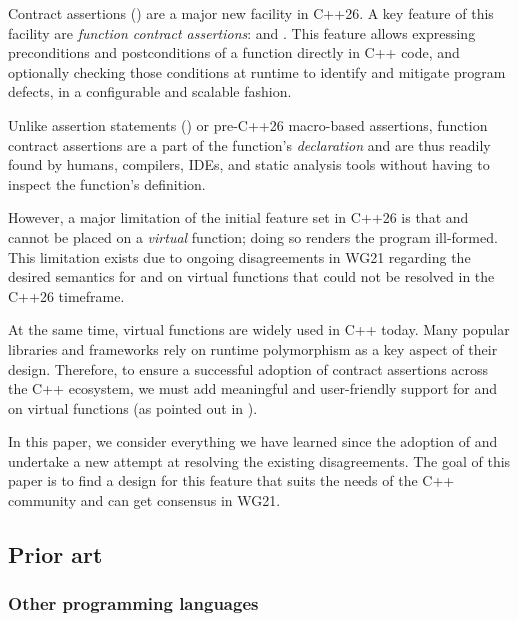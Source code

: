 Contract assertions (\cite{P2900R14}) are a major new facility in C++26. A key feature of this facility are \emph{function contract assertions}:  and . This feature allows expressing
preconditions and postconditions of a function directly in C++ code, and optionally checking those conditions at runtime to identify and mitigate program defects, in a configurable and scalable fashion. 

Unlike assertion statements () or pre-C++26 macro-based assertions, function contract assertions are a part of the function's \emph{declaration} and are thus readily found by humans, compilers, IDEs, and static analysis tools without having to inspect the function's definition. 

However, a major limitation of the initial feature set in C++26 is that  and  cannot be placed on a \emph{virtual} function; doing so renders the program ill-formed. This limitation exists due to ongoing disagreements in WG21 regarding the desired semantics for  and  on virtual functions that could not be resolved in the C++26 timeframe.

At the same time, virtual functions are widely used in C++ today. Many popular libraries and frameworks rely on runtime polymorphism as a key aspect of their design. Therefore, to ensure a successful adoption of contract assertions across the C++ ecosystem, we must add meaningful and user-friendly support for  and  on virtual functions (as pointed out in \cite{P3173R0}).

In this paper, we consider everything we have learned since the adoption of \cite{P2900R14} and undertake a new attempt at resolving the existing disagreements. The goal of this paper is to find a design for this feature that suits the needs of the C++ community and can get consensus in WG21.

\subsection{Prior art}

\subsubsection{Other programming languages}

